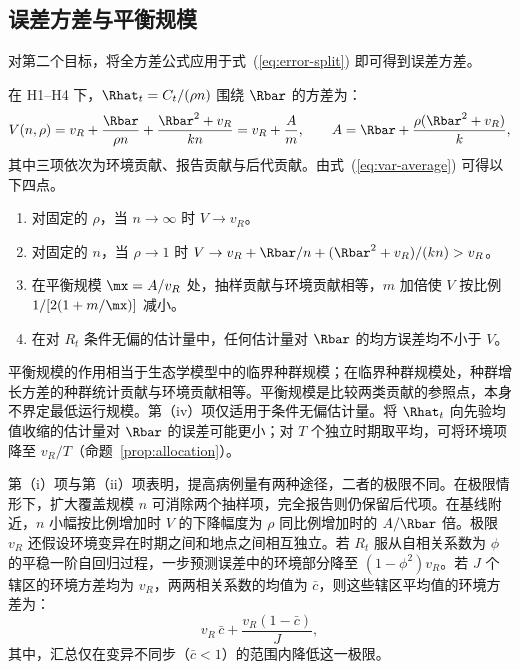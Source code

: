 \subsection{误差方差与平衡规模}
\label{sec:bg-variance}

对第二个目标，将全方差公式应用于式~(\ref{eq:error-split}) 即可得到误差方差。

\begin{proposition}[跨期均值的误差方差]
\label{prop:average}
在 H1--H4 下，$\Rhat_t=C_t/(\rho n)$ 围绕 $\Rbar$ 的方差为：
\begin{equation}
  V(n,\rho)=v_R+\frac{\Rbar}{\rho n}+\frac{\Rbar^2+v_R}{kn}=v_R+\frac{A}{m},
  \qquad A=\Rbar+\frac{\rho(\Rbar^2+v_R)}{k}, %
  \label{eq:var-average}
\end{equation}
其中三项依次为环境贡献、报告贡献与后代贡献。由式~(\ref{eq:var-average}) 可得以下四点。
\begin{enumerate}[label=(\roman*),leftmargin=2em]
  \item 对固定的 $\rho$，当 $n\to\infty$ 时 $V\to v_R$。
  \item 对固定的 $n$，当 $\rho\to1$ 时 $V\to v_R+\Rbar/n+(\Rbar^2+v_R)/(kn)>v_R$。
  \item 在平衡规模 $\mx=A/v_R$ 处，抽样贡献与环境贡献相等，$m$ 加倍使 $V$ 按比例 $1/[2(1+m/\mx)]$ 减小。
  \item 在对 $R_t$ 条件无偏的估计量中，任何估计量对 $\Rbar$ 的均方误差均不小于 $V$。
\end{enumerate}
\end{proposition}

平衡规模的作用相当于生态学模型中的临界种群规模；在临界种群规模处，种群增长方差的种群统计贡献与环境贡献相等\citep{lande2003stochastic}。平衡规模是比较两类贡献的参照点，本身不界定最低运行规模。第（iv）项仅适用于条件无偏估计量。将 $\Rhat_t$ 向先验均值收缩的估计量对 $\Rbar$ 的误差可能更小；对 $T$ 个独立时期取平均，可将环境项降至 $v_R/T$（命题~\ref{prop:allocation}）。

第（i）项与第（ii）项表明，提高病例量有两种途径，二者的极限不同。在极限情形下，扩大覆盖规模 $n$ 可消除两个抽样项，完全报告则仍保留后代项。在基线附近，$n$ 小幅按比例增加时 $V$ 的下降幅度为 $\rho$ 同比例增加时的 $A/\Rbar$ 倍。极限 $v_R$ 还假设环境变异在时期之间和地点之间相互独立。若 $R_t$ 服从自相关系数为 $\phi$ 的平稳一阶自回归过程，一步预测误差中的环境部分降至 $(1-\phi^2)v_R$。若 $J$ 个辖区的环境方差均为 $v_R$，两两相关系数的均值为 $\bar{c}$，则这些辖区平均值的环境方差为：
\begin{equation}
  v_R\,\bar{c}+\frac{v_R(1-\bar{c})}{J},
  \label{eq:pooling}
\end{equation}
其中，汇总仅在变异不同步（$\bar{c}<1$）的范围内降低这一极限。

